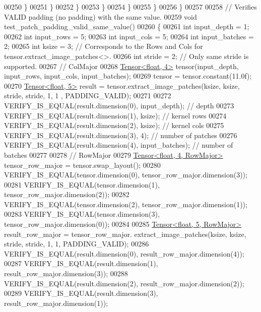 \begin{DoxyCode}
00250             \}
00251           \}
00252         \}
00253       \}
00254     \}
00255   \}
00256 \}
00257 
00258 \textcolor{comment}{// Verifies VALID padding (no padding) with the same value.}
00259 \textcolor{keywordtype}{void} test\_patch\_padding\_valid\_same\_value()
00260 \{
00261   \textcolor{keywordtype}{int} input\_depth = 1;
00262   \textcolor{keywordtype}{int} input\_rows = 5;
00263   \textcolor{keywordtype}{int} input\_cols = 5;
00264   \textcolor{keywordtype}{int} input\_batches = 2;
00265   \textcolor{keywordtype}{int} ksize = 3;  \textcolor{comment}{// Corresponds to the Rows and Cols for tensor.extract\_image\_patches<>.}
00266   \textcolor{keywordtype}{int} stride = 2;  \textcolor{comment}{// Only same stride is supported.}
00267   \textcolor{comment}{// ColMajor}
00268   \hyperlink{class_eigen_1_1_tensor}{Tensor<float, 4>} tensor(input\_depth, input\_rows, input\_cols, input\_batches);
00269   tensor = tensor.constant(11.0f);
00270   \hyperlink{class_eigen_1_1_tensor}{Tensor<float, 5>} result = tensor.extract\_image\_patches(ksize, ksize, stride, stride, 1, 1
      , PADDING\_VALID);
00271 
00272   VERIFY\_IS\_EQUAL(result.dimension(0), input\_depth);  \textcolor{comment}{// depth}
00273   VERIFY\_IS\_EQUAL(result.dimension(1), ksize);  \textcolor{comment}{// kernel rows}
00274   VERIFY\_IS\_EQUAL(result.dimension(2), ksize);  \textcolor{comment}{// kernel cols}
00275   VERIFY\_IS\_EQUAL(result.dimension(3), 4);  \textcolor{comment}{// number of patches}
00276   VERIFY\_IS\_EQUAL(result.dimension(4), input\_batches);  \textcolor{comment}{// number of batches}
00277 
00278   \textcolor{comment}{// RowMajor}
00279   \hyperlink{class_eigen_1_1_tensor}{Tensor<float, 4, RowMajor>} tensor\_row\_major = tensor.swap\_layout();
00280   VERIFY\_IS\_EQUAL(tensor.dimension(0), tensor\_row\_major.dimension(3));
00281   VERIFY\_IS\_EQUAL(tensor.dimension(1), tensor\_row\_major.dimension(2));
00282   VERIFY\_IS\_EQUAL(tensor.dimension(2), tensor\_row\_major.dimension(1));
00283   VERIFY\_IS\_EQUAL(tensor.dimension(3), tensor\_row\_major.dimension(0));
00284 
00285   \hyperlink{class_eigen_1_1_tensor}{Tensor<float, 5, RowMajor>} result\_row\_major = tensor\_row\_major.
      extract\_image\_patches(ksize, ksize, stride, stride, 1, 1, PADDING\_VALID);
00286   VERIFY\_IS\_EQUAL(result.dimension(0), result\_row\_major.dimension(4));
00287   VERIFY\_IS\_EQUAL(result.dimension(1), result\_row\_major.dimension(3));
00288   VERIFY\_IS\_EQUAL(result.dimension(2), result\_row\_major.dimension(2));
00289   VERIFY\_IS\_EQUAL(result.dimension(3), result\_row\_major.dimension(1));

\end{DoxyCode}
